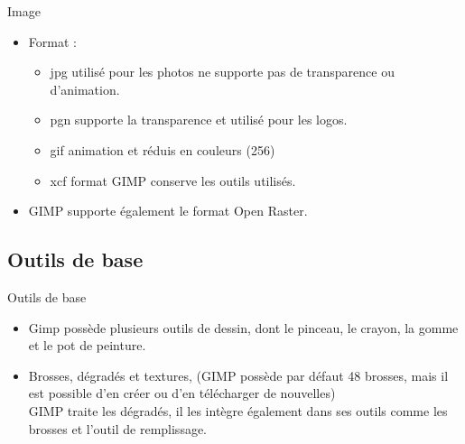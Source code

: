 \documentclass[xcolor=x11names,compress]{beamer}
\renewcommand{\(}{\begin{columns}}
\renewcommand{\)}{\end{columns}}
\newcommand{\<}[1]{\begin{column}{#1}}
\renewcommand{\>}{\end{column}}
\begin{document}
\begin{frame}{Image}
\begin{itemize}
\item Format : 
\begin{itemize}
\item jpg utilisé pour les photos ne supporte pas de transparence ou d’animation.
\end{itemize}
\begin{itemize}
\item pgn supporte la transparence et utilisé pour les logos. 
\end{itemize}
\begin{itemize}
\item gif animation et réduis en couleurs (256) 
\end{itemize}
\begin{itemize}
\item xcf format GIMP conserve les outils utilisés.
\end{itemize}
\end{itemize}
\begin{itemize}
\item GIMP supporte également le format Open Raster.
\end{itemize}
\end{frame}
\subsection{Outils de base}
\begin{frame}{Outils de base}
\begin{itemize}
\item Gimp possède plusieurs outils de dessin, dont le pinceau, le crayon, la gomme et le pot de peinture.

\end{itemize}
\begin{itemize}
\item Brosses, dégradés et textures, (GIMP possède par défaut 48 brosses, mais il est possible d'en créer ou d'en télécharger de nouvelles) \\GIMP traite les dégradés, il les intègre également dans ses outils comme les brosses et l'outil de remplissage.
\end{itemize}

\end{frame}
\end{document}
